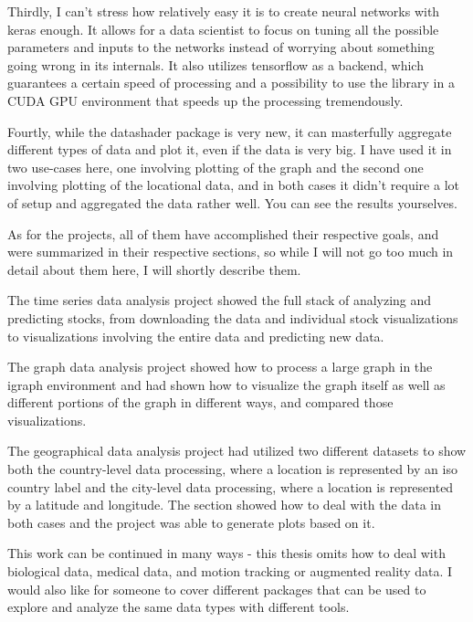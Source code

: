 \documentclass[12pt, a4paper]{article}
\begin{document}
Thirdly, I can't stress how relatively easy it is to create neural networks with keras enough. It allows for a data scientist to focus on tuning all the possible parameters and inputs to the networks instead of worrying about something going wrong in its internals. It also utilizes tensorflow as a backend, which guarantees a certain speed of processing and a possibility to use the library in a CUDA GPU environment that speeds up the processing tremendously.

Fourtly, while the datashader package is very new, it can masterfully aggregate different types of data and plot it, even if the data is very big. I have used it in two use-cases here, one involving plotting of the graph and the second one involving plotting of the locational data, and in both cases it didn't require a lot of setup and aggregated the data rather well. You can see the results yourselves.

As for the projects, all of them have accomplished their respective goals, and were summarized in their respective sections, so while I will not go too much in detail about them here, I will shortly describe them.

The time series data analysis project showed the full stack of analyzing and predicting stocks, from downloading the data and individual stock visualizations to visualizations involving the entire data and predicting new data.

The graph data analysis project showed how to process a large graph in the igraph environment and had shown how to visualize the graph itself as well as different portions of the graph in different ways, and compared those visualizations.

The geographical data analysis project had utilized two different datasets to show both the country-level data processing, where a location is represented by an iso country label and the city-level data processing, where a location is represented by a latitude and longitude. The section showed how to deal with the data in both cases and the project was able to generate plots based on it.

This work can be continued in many ways - this thesis omits how to deal with biological data, medical data, and motion tracking or augmented reality data. I would also like for someone to cover different packages that can be used to explore and analyze the same data types with different tools.

\newpage

\printbibliography[heading=bibnumbered, title={REFERENCES}]
\end{document}

